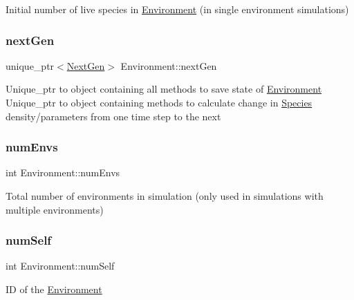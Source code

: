 Initial number of live species in \hyperlink{classEnvironment}{Environment} (in single environment simulations) \mbox{\label{classEnvironment_ad696c5a7be91ffc89586abb10281e181}} 
\subsubsection{\texorpdfstring{next\+Gen}{nextGen}}
{\footnotesize\ttfamily unique\+\_\+ptr$<$\hyperlink{classNextGen}{Next\+Gen}$>$ Environment\+::next\+Gen\hspace{0.3cm}{\ttfamily [protected]}}

Unique\+\_\+ptr to object containing all methods to save state of \hyperlink{classEnvironment}{Environment} Unique\+\_\+ptr to object containing methods to calculate change in \hyperlink{classSpecies}{Species} density/parameters from one time step to the next \mbox{\label{classEnvironment_ab9b14bfdd2e25805a6e67463e948da4a}} 
\subsubsection{\texorpdfstring{num\+Envs}{numEnvs}}
{\footnotesize\ttfamily int Environment\+::num\+Envs\hspace{0.3cm}{\ttfamily [protected]}}

Total number of environments in simulation (only used in simulations with multiple environments) \mbox{\label{classEnvironment_a2563f570023ff1e17f87549bcf2fab59}} 
\subsubsection{\texorpdfstring{num\+Self}{numSelf}}
{\footnotesize\ttfamily int Environment\+::num\+Self\hspace{0.3cm}{\ttfamily [protected]}}

ID of the \hyperlink{classEnvironment}{Environment} \mbox{\label{classEnvironment_a27a1684288d74f2cabb8cfbd0848b14e}} 
